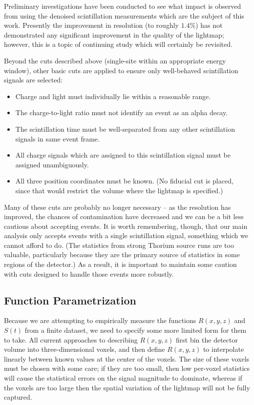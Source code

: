 Preliminary investigations have been conducted to see what impact is observed from using the denoised scintillation measurements which are the subject of this work.  Presently the improvement in resolution (to roughly $1.4\%$) has not demonstrated any significant improvement in the quality of the lightmap; however, this is a topic of continuing study which will certainly be revisited.

Beyond the cuts described above (single-site within an appropriate energy window), other basic cuts are applied to ensure only well-behaved scintillation signals are selected:
\begin{itemize}
\item Charge and light must individually lie within a reasonable range.
\item The charge-to-light ratio must not identify an event as an alpha decay.
\item The scintillation time must be well-separated from any other scintillation signals in same event frame.
\item All charge signals which are assigned to this scintillation signal must be assigned unambiguously.
\item All three position coordinates must be known.  (No fiducial cut is placed, since that would restrict the volume where the lightmap is specified.)
\end{itemize}
Many of these cuts are probably no longer necessary -- as the resolution has improved, the chances of contamination have decreased and we can be a bit less cautious about accepting events.  It is worth remembering, though, that our main analysis only accepts events with a single scintillation signal, something which we cannot afford to do.  (The statistics from strong Thorium source runs are too valuable, particularly because they are the primary source of statistics in some regions of the detector.)  As a result, it is important to maintain some caution with cuts designed to handle those events more robustly.

\subsection{Function Parametrization}

Because we are attempting to empirically measure the functions $R(x,y,z)$ and $S(t)$ from a finite dataset, we need to specify some more limited form for them to take.  All current approaches to describing $R(x,y,z)$ first bin the detector volume into three-dimensional voxels, and then define $R(x,y,z)$ to interpolate linearly between known values at the center of the voxels.  The size of these voxels must be chosen with some care; if they are too small, then low per-voxel statistics will cause the statistical errors on the signal magnitude to dominate, whereas if the voxels are too large then the spatial variation of the lightmap will not be fully captured.

